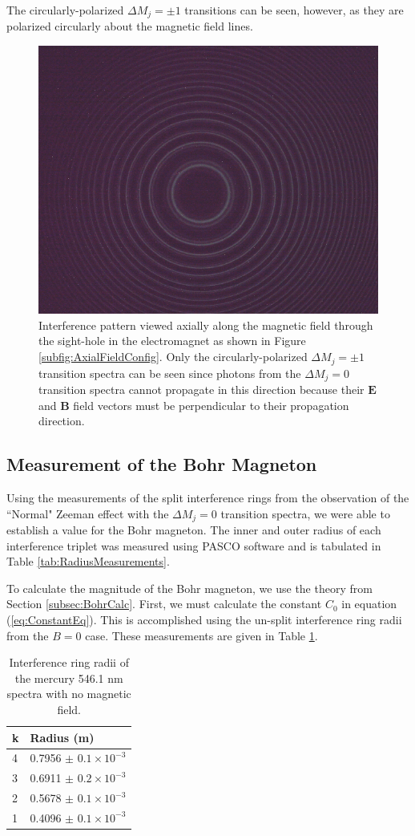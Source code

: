 \documentclass[twocolumn]{article}
\begin{document}
		The circularly-polarized $\Delta M_j = \pm1$ transitions can be seen, however, as they are polarized circularly about the magnetic field lines.
		
		\begin{figure}
			\centering
			\includegraphics[width=0.55\linewidth]{Images/Run3_AxialField}
			\caption{Interference pattern viewed axially along the magnetic field through the sight-hole in the electromagnet as shown in Figure \ref{subfig:AxialFieldConfig}. Only the circularly-polarized $\Delta M_j = \pm1$ transition spectra can be seen since photons from the $\Delta M_j = 0$ transition spectra cannot propagate in this direction because their $\mathbf{E}$ and $\mathbf{B}$ field vectors must be perpendicular to their propagation direction.}
			\label{fig:Run3_AxialField}
		\end{figure}

	\subsection{Measurement of the Bohr Magneton} \label{subsec:BohrMagneton}
		Using the measurements of the split interference rings from the observation of the ``Normal" Zeeman effect with the $\Delta M_j = 0$ transition spectra, we were able to establish a value for the Bohr magneton.
		The inner and outer radius of each interference triplet was measured using PASCO software and is tabulated in Table \ref{tab:RadiusMeasurements}.
		
		To calculate the magnitude of the Bohr magneton, we use the theory from Section \ref{subsec:BohrCalc}.
		First, we must calculate the constant $C_0$ in equation (\ref{eq:ConstantEq}).
		This is accomplished using the un-split interference ring radii from the $B=0$ case.
		These measurements are given in Table \ref{tab:B0Data}.
		
		\begin{table}[h]
			\centering
			\begin{tabular}{l|l}
				k & Radius (m) \\ \hline
				4 & 0.7956 $\pm$ $0.1\times10^{-3}$    \\
				3 & 0.6911 $\pm$ $0.2\times10^{-3}$    \\
				2 & 0.5678 $\pm$ $0.1\times10^{-3}$    \\
				1 & 0.4096 $\pm$ $0.1\times10^{-3}$   
			\end{tabular}
			\caption{Interference ring radii of the mercury 546.1 nm spectra with no magnetic field.}
			\label{tab:B0Data}
		\end{table}
		
\end{document}
